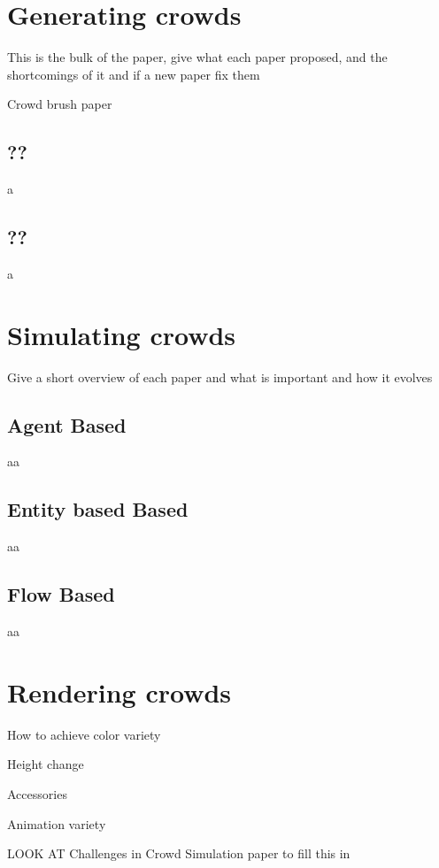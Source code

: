 \documentclass[11pt,twocolumn]{article}
\numberwithin{equation}{section} %
\numberwithin{figure}{section} %
\numberwithin{table}{section} %
\begin{document}
\section{Generating crowds}

This is the bulk of the paper, give what each paper proposed, and the shortcomings
of it and if a new paper fix them
 
Crowd brush paper

\subsection{??}

a

\subsection{??}

a

\section{Simulating crowds}

Give a short overview of each paper and what is important and how it evolves

\subsection{Agent Based}

aa

\subsection{Entity based Based}

aa

\subsection{Flow Based}

aa

\section{Rendering crowds}

How to achieve color variety

Height change

Accessories 

Animation variety

LOOK AT Challenges in Crowd Simulation paper to fill this in
\end{document}
